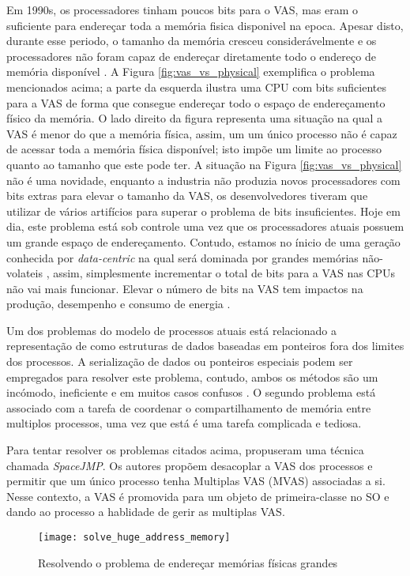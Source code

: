 Em 1990s, os processadores tinham poucos bits para o VAS, mas eram o suficiente
para endereçar toda a memória fisica disponivel na epoca. Apesar disto, durante
esse periodo, o tamanho da memória cresceu considerávelmente e os processadores
não foram capaz de endereçar diretamente todo o endereço de memória disponível
\cite{crowley}. A Figura \ref{fig:vas_vs_physical} exemplifica o problema
mencionados acima; a parte da esquerda ilustra uma CPU com bits suficientes
para a VAS de forma que consegue endereçar todo o espaço de endereçamento
físico da memória. O lado direito da figura representa uma situação na qual a
VAS é menor do que a memória física, assim, um um único processo não é capaz de
acessar toda a memória física disponível; isto impõe um limite ao processo
quanto ao tamanho que este pode ter. A situação na Figura
\ref{fig:vas_vs_physical} não é uma novidade, enquanto a industria não produzia
novos processadores com bits extras para elevar o tamanho da VAS, os
desenvolvedores tiveram que utilizar de vários artifícios para superar o
problema de bits insuficientes. Hoje em dia, este problema está sob controle
uma vez que os processadores atuais possuem um grande espaço de endereçamento.
Contudo, estamos no ínicio de uma geração conhecida por \emph{data-centric} na
qual será dominada por grandes memórias não-volateis \citep{outlook}, assim,
simplesmente incrementar o total de bits para a VAS nas CPUs não vai mais
funcionar. Elevar o número de bits na VAS tem impactos na produção, desempenho
e consumo de energia \citep{spacejmp}.

Um dos problemas do modelo de processos atuais está relacionado a representação
de como estruturas de dados baseadas em ponteiros fora dos limites dos
processos. A serialização de dados ou ponteiros especiais podem ser empregados
para resolver este problema, contudo, ambos os métodos são um incómodo,
ineficiente e em muitos casos confusos \cite{spacejmp}. O segundo problema está
associado com a tarefa de coordenar o compartilhamento de memória entre
multiplos processos, uma vez que está é uma tarefa complicada e tediosa.

Para tentar resolver os problemas citados acima, \cite{spacejmp} propuseram uma
técnica chamada \emph{SpaceJMP}. Os autores propõem desacoplar a VAS dos
processos e permitir que um único processo tenha Multiplas VAS (MVAS)
associadas a si. Nesse contexto, a VAS é promovida para um objeto de
primeira-classe no SO e dando ao processo a hablidade de gerir as multiplas
VAS.

\begin{figure}[!h]
  \centering
  \texttt{[image: solve\_huge\_address\_memory]}
  \caption{Resolvendo o problema de endereçar memórias físicas grandes}
  \label{fig:large_memory}
\end{figure}

